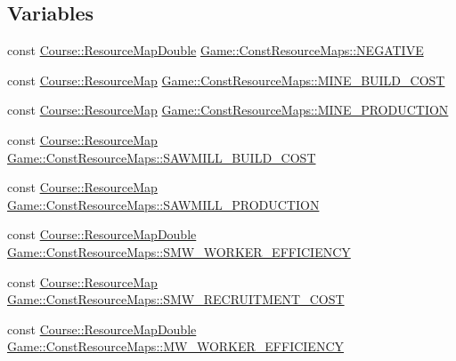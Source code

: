 \subsection*{Variables}
\begin{DoxyCompactItemize}
\item 
const \hyperlink{namespaceCourse_a0b96bae1a664dde34efbb1b42dea615e}{Course\-::\-Resource\-Map\-Double} \hyperlink{namespaceGame_1_1ConstResourceMaps_a47a3f289ff3f23e3c884335f8eaa067d}{Game\-::\-Const\-Resource\-Maps\-::\-N\-E\-G\-A\-T\-I\-V\-E}
\item 
const \hyperlink{namespaceCourse_ab9a46ed9cd00485e318e5731ea2f78d9}{Course\-::\-Resource\-Map} \hyperlink{namespaceGame_1_1ConstResourceMaps_adda0aad5b2188a57d2d187f692e2c2f9}{Game\-::\-Const\-Resource\-Maps\-::\-M\-I\-N\-E\-\_\-\-B\-U\-I\-L\-D\-\_\-\-C\-O\-S\-T}
\item 
const \hyperlink{namespaceCourse_ab9a46ed9cd00485e318e5731ea2f78d9}{Course\-::\-Resource\-Map} \hyperlink{namespaceGame_1_1ConstResourceMaps_ad58736a7028bf9bdd46583af4cb3d410}{Game\-::\-Const\-Resource\-Maps\-::\-M\-I\-N\-E\-\_\-\-P\-R\-O\-D\-U\-C\-T\-I\-O\-N}
\item 
const \hyperlink{namespaceCourse_ab9a46ed9cd00485e318e5731ea2f78d9}{Course\-::\-Resource\-Map} \hyperlink{namespaceGame_1_1ConstResourceMaps_a8101879b3f9a231535e629475969da07}{Game\-::\-Const\-Resource\-Maps\-::\-S\-A\-W\-M\-I\-L\-L\-\_\-\-B\-U\-I\-L\-D\-\_\-\-C\-O\-S\-T}
\item 
const \hyperlink{namespaceCourse_ab9a46ed9cd00485e318e5731ea2f78d9}{Course\-::\-Resource\-Map} \hyperlink{namespaceGame_1_1ConstResourceMaps_a1302532b63eb3d623779fb539dd767e8}{Game\-::\-Const\-Resource\-Maps\-::\-S\-A\-W\-M\-I\-L\-L\-\_\-\-P\-R\-O\-D\-U\-C\-T\-I\-O\-N}
\item 
const \hyperlink{namespaceCourse_a0b96bae1a664dde34efbb1b42dea615e}{Course\-::\-Resource\-Map\-Double} \hyperlink{namespaceGame_1_1ConstResourceMaps_aa229959dcf7750d06878db7f5c4d0bae}{Game\-::\-Const\-Resource\-Maps\-::\-S\-M\-W\-\_\-\-W\-O\-R\-K\-E\-R\-\_\-\-E\-F\-F\-I\-C\-I\-E\-N\-C\-Y}
\item 
const \hyperlink{namespaceCourse_ab9a46ed9cd00485e318e5731ea2f78d9}{Course\-::\-Resource\-Map} \hyperlink{namespaceGame_1_1ConstResourceMaps_aece4521104576e9af5ab8635b786c840}{Game\-::\-Const\-Resource\-Maps\-::\-S\-M\-W\-\_\-\-R\-E\-C\-R\-U\-I\-T\-M\-E\-N\-T\-\_\-\-C\-O\-S\-T}
\item 
const \hyperlink{namespaceCourse_a0b96bae1a664dde34efbb1b42dea615e}{Course\-::\-Resource\-Map\-Double} \hyperlink{namespaceGame_1_1ConstResourceMaps_a11fc543cda6cf6dbd703559e230eb49a}{Game\-::\-Const\-Resource\-Maps\-::\-M\-W\-\_\-\-W\-O\-R\-K\-E\-R\-\_\-\-E\-F\-F\-I\-C\-I\-E\-N\-C\-Y}

\end{DoxyCompactItemize}
